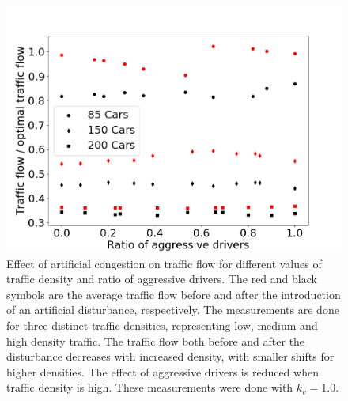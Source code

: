 \documentclass[11pt,a4paper,twocolumn]{article}
\begin{document}
\begin{figure}[ht]     
      \centering
       \includegraphics[scale=0.33]{figs/traffic_density_effect}
       \caption{Effect of artificial congestion on traffic flow for different values of traffic density and ratio of aggressive drivers. The red and black symbols are the average traffic flow before and after the introduction of an artificial disturbance, respectively. The measurements are done for three distinct traffic densities, representing low, medium and high density traffic. The traffic flow both before and after the disturbance decreases with increased density, with smaller shifts for higher densities. The effect of aggressive drivers is reduced  when traffic density is high. These measurements were done with $k_v=1.0$.}
       \label{fig:traffic_density}
 \end{figure}
 
\end{document}

